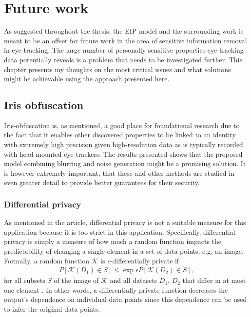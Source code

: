 \chapter{Future work}
As suggested throughout the thesis, the EIP model and the surrounding work is meant to be an offset for future work in the area of sensitive information removal in eye-tracking. The large number of personally sensitive properties eye-tracking data potentially reveals is a problem that needs to be investigated further. This chapter presents my thoughts on the most critical issues and what solutions might be achievable using the approach presented here.



\section{Iris obfuscation}
Iris-obfuscation is, as mentioned, a good place for foundational research due to the fact that it enables other discovered properties to be linked to an identity with extremely high precision given high-resolution data as is typically recorded with head-mounted eye-trackers. The results presented shows that the proposed model combining blurring and noise generation might be a promising solution. It is however extremely important, that these and other methods are studied in even greater detail to provide better guarantees for their security. 

\subsection{Differential privacy}
As mentioned in the article, differential privacy is not a suitable measure for this application because it is too strict in this application. Specifically, differential privacy is simply a measure of how much a random function impacts the predictability of changing a single element in a set of data points, e.g. an image. Formally, a random function $\mathcal{K}$ is $\epsilon$-differentially private if
\begin{align}
	P[\mathcal{K}(D_1)\in S] \leq \exp{\epsilon} P[\mathcal{K}(D_2)\in S],
\end{align}
for all subsets $S$ of the image of $\mathcal{K}$ and all datasets $D_1$, $D_2$ that differ in at most one element \parencite{dwork2006differential}. In other words, a differentially private function decreases the output's dependence on individual data points since this dependence can be used to infer the original data points.

